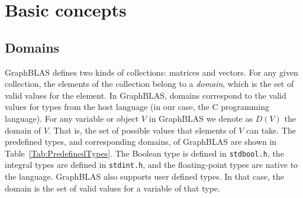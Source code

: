 \documentclass[11pt]{extarticle}
\begin{document}

\section{Basic concepts}

\subsection{Domains}

GraphBLAS defines two kinds of collections: matrices and vectors.
For any given collection, the elements of the collection belong to
a \emph{domain}, which is the set of valid values for the element.
In GraphBLAS, domains correspond to the valid values for types from
the host language (in our case, the C programming language).  For any
variable or object $V$ in GraphBLAS we denote as $D(V)$ the domain of
$V$. That is, the set of possible values that elements of $V$ can take.
The predefined types, and corresponding domains, of GraphBLAS are shown
in Table~\ref{Tab:PredefinedTypes}.  The Boolean type is defined in
{\tt stdbool.h}, the integral types are defined in {\tt stdint.h}, and
the floating-point types are native to the language.  GraphBLAS also
supports user defined types. In that case, the domain is the set of
valid values for a variable of that type.
\end{document}
